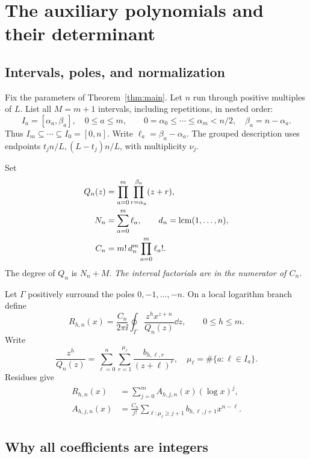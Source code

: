 \section{The auxiliary polynomials and their determinant}
\label{sec:algebra}

\subsection{Intervals, poles, and normalization}

Fix the parameters of Theorem~\ref{thm:main}. Let \(n\) run through
positive multiples of \(L\). List all \(M=m+1\) intervals, including
repetitions, in nested order:
\[
I_a=[\alpha_a,\beta_a],\quad 0\le a\le m,\qquad
0=\alpha_0\le\cdots\le\alpha_m<n/2,\quad
\beta_a=n-\alpha_a.
\]
Thus \(I_m\subseteq\cdots\subseteq I_0=[0,n]\).
Write \(\ell_a=\beta_a-\alpha_a\).
The grouped description uses endpoints
\(t_jn/L,(L-t_j)n/L\), with multiplicity \(\nu_j\).

Set
\begin{equation}\label{eq:QandC}
\begin{split}
Q_n(z)&=\prod_{a=0}^{m}\prod_{r=\alpha_a}^{\beta_a}(z+r),\\
N_n&=\sum_{a=0}^{m}\ell_a,\qquad
d_n=\operatorname{lcm}(1,\ldots,n),\\
C_n&=m!\,d_n^m\prod_{a=0}^{m}\ell_a!.
\end{split}
\end{equation}
The degree of \(Q_n\) is \(N_n+M\).
\emph{The interval factorials are in the numerator of \(C_n\).}

Let \(\Gamma\) positively surround the poles \(0,-1,\ldots,-n\).
On a local logarithm branch define
\begin{equation}\label{eq:Rdef}
R_{h,n}(x)=\frac{C_n}{2\pi\ii}
\oint_\Gamma \frac{z^h x^{z+n}}{Q_n(z)}\dd z,\qquad 0\le h\le m.
\end{equation}
Write
\[
\frac{z^h}{Q_n(z)}
=\sum_{\ell=0}^{n}\sum_{r=1}^{\mu_\ell}
\frac{b_{h,\ell,r}}{(z+\ell)^r},
\quad
\mu_\ell=\#\{a:\ell\in I_a\}.
\]
Residues give
\begin{align}
R_{h,n}(x)&=\sum_{j=0}^{m}A_{h,j,n}(x)(\log x)^j,\label{eq:Rexpand}\\
A_{h,j,n}(x)&=\frac{C_n}{j!}
\sum_{\ell:\mu_\ell\ge j+1}
b_{h,\ell,j+1}x^{n-\ell}.\label{eq:Adef}
\end{align}

\subsection{Why all coefficients are integers}

